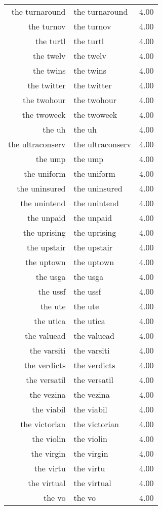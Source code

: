 \begin{table}[ht]
\begin{tabular}{rlr}
  the turnaround & the turnaround & 4.00 \\ 
  the turnov & the turnov & 4.00 \\ 
  the turtl & the turtl & 4.00 \\ 
  the twelv & the twelv & 4.00 \\ 
  the twins & the twins & 4.00 \\ 
  the twitter & the twitter & 4.00 \\ 
  the twohour & the twohour & 4.00 \\ 
  the twoweek & the twoweek & 4.00 \\ 
  the uh & the uh & 4.00 \\ 
  the ultraconserv & the ultraconserv & 4.00 \\ 
  the ump & the ump & 4.00 \\ 
  the uniform & the uniform & 4.00 \\ 
  the uninsured & the uninsured & 4.00 \\ 
  the unintend & the unintend & 4.00 \\ 
  the unpaid & the unpaid & 4.00 \\ 
  the uprising & the uprising & 4.00 \\ 
  the upstair & the upstair & 4.00 \\ 
  the uptown & the uptown & 4.00 \\ 
  the usga & the usga & 4.00 \\ 
  the ussf & the ussf & 4.00 \\ 
  the ute & the ute & 4.00 \\ 
  the utica & the utica & 4.00 \\ 
  the valuead & the valuead & 4.00 \\ 
  the varsiti & the varsiti & 4.00 \\ 
  the verdicts & the verdicts & 4.00 \\ 
  the versatil & the versatil & 4.00 \\ 
  the vezina & the vezina & 4.00 \\ 
  the viabil & the viabil & 4.00 \\ 
  the victorian & the victorian & 4.00 \\ 
  the violin & the violin & 4.00 \\ 
  the virgin & the virgin & 4.00 \\ 
  the virtu & the virtu & 4.00 \\ 
  the virtual & the virtual & 4.00 \\ 
  the vo & the vo & 4.00 \\ 

\end{tabular}
\end{table}
